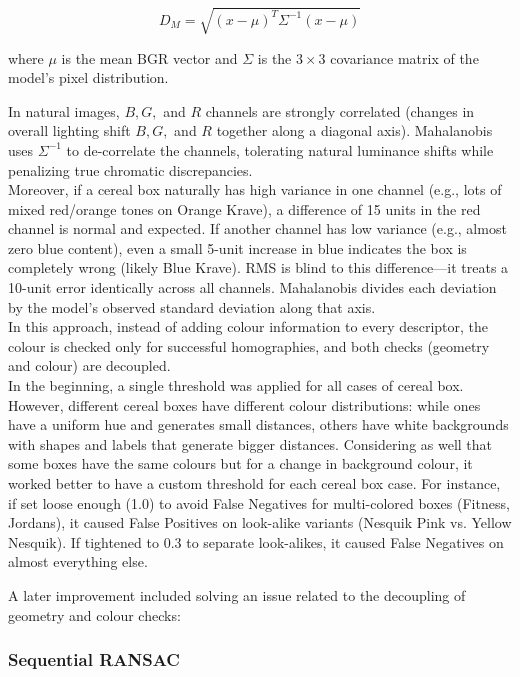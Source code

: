 \documentclass[12pt]{article}
\begin{document}
$$D_M = \sqrt{(x - \mu)^T \Sigma^{-1} (x - \mu)}$$

where $\mu$ is the mean BGR vector and $\Sigma$ is the $3 \times 3$ covariance matrix of the model's pixel distribution.

In natural images, $B, G,$ and $R$ channels are strongly correlated (changes in overall lighting shift $B, G,$ and $R$ together along a diagonal axis). Mahalanobis uses $\Sigma^{-1}$ to de-correlate the channels, tolerating natural luminance shifts while penalizing true chromatic discrepancies.\\

Moreover, if a cereal box naturally has high variance in one channel (e.g., lots of mixed red/orange tones on Orange Krave), a difference of 15 units in the red channel is normal and expected.
If another channel has low variance (e.g., almost zero blue content), even a small 5-unit increase in blue indicates the box is completely wrong (likely Blue Krave).
RMS is blind to this difference—it treats a 10-unit error identically across all channels. Mahalanobis divides each deviation by the model's observed standard deviation along that axis.\\

In this approach, instead of adding colour information to every descriptor, the colour is checked only for successful homographies, and both checks (geometry and colour) are decoupled.\\

In the beginning, a single threshold was applied for all cases of cereal box. However, different cereal boxes have different colour distributions: while ones have a uniform hue and generates small distances, others have white backgrounds with shapes and labels that generate bigger distances. Considering as well that some boxes have the same colours but for a change in background colour, it worked better to have a custom threshold for each cereal box case. For instance, if set loose enough (1.0) to avoid False Negatives for multi-colored boxes (Fitness, Jordans), it caused False Positives on look-alike variants (Nesquik Pink vs. Yellow Nesquik). If tightened to 0.3 to separate look-alikes, it caused False Negatives on almost everything else.

A later improvement included solving an issue related to the decoupling of geometry and colour checks:

\subsubsection{Sequential RANSAC}
\end{document}
